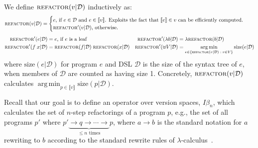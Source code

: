 \documentclass{article}
\newcommand{\denotation}[1]{{\llbracket #1 \rrbracket}}
\DeclareMathOperator*{\argmin}{arg\,min} %
\newcommand{\reduce}{\longrightarrow}
\begin{document}
We define $\textsc{refactor}(v|\mathcal{D})$ inductively as:
\begin{align*}
  \textsc{refactor}(v|\mathcal{D}) &= \begin{cases}
    e\text{, if $e\in \mathcal{D}$ and $e\in \denotation{v}$. Exploits the fact that $\denotation{e}\in v$ can be efficiently computed.}\\
    \textsc{refactor}'(v|\mathcal{D})\text{, otherwise.}
  \end{cases}
\end{align*}\vspace{-\baselineskip}%
\begin{align*}
  \textsc{refactor}'(e|\mathcal{D})& = e\text{, if $e$ is a leaf}&%
  \textsc{refactor}'(\lambda b|\mathcal{D}) &= \lambda \textsc{refactor}(b|\mathcal{D})\\\nonumber
  \textsc{refactor}'(f\;x|\mathcal{D}) &= \textsc{refactor}(f|\mathcal{D})\;\textsc{refactor}(x|\mathcal{D})&%
  \textsc{refactor}'(\uplus V|\mathcal{D}) &= \argmin_{e\in \left\{\textsc{refactor}(v|\mathcal{D})\;:\;v\in V \right\}}\text{size}(e|\mathcal{D})\nonumber
  \end{align*}
where $\text{size}(e|\mathcal{D})$ for program $e$ and DSL $\mathcal{D}$
is the size of the syntax tree of $e$,
when members of $\mathcal{D}$ are counted as having size 1.
Concretely, $  \textsc{refactor}(v|\mathcal{D})$ calculates $\argmin_{p\in \denotation{v}}\text{size}(p|\mathcal{D})$.


Recall that our goal is to define an operator over version spaces, $I\beta_n$,
which calculates the set of $n$-step refactorings of a program $p$,
e.g.,
the set of all programs $p'$ where
$p'\underbrace{\reduce q\reduce\cdots\reduce}_{\text{$\leq n$ times}} p$,
where $a \reduce b$
is the standard notation
for $a$ rewriting to $b$ according to the standard rewrite rules of $\lambda$-calculus~\cite{pierce}.
\end{document}
